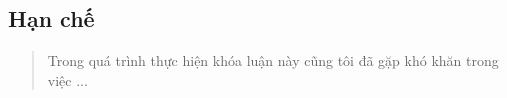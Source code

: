 \subsection{Hạn chế}\label{hux1ea1n-chux1ebf}

\begin{quote}
Trong quá trình thực hiện khóa luận này cũng tôi đã gặp khó khăn trong việc ...
\end{quote}
